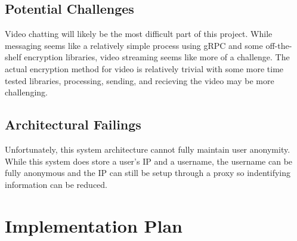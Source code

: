 \documentclass[titlepage]{article}
\begin{document}
    \subsection{Potential Challenges}

    Video chatting will likely be the most difficult part of this project.
    While messaging seems like a relatively simple process using gRPC and some off-the-shelf encryption libraries, video streaming seems like more of a challenge.
    The actual encryption method for video is relatively trivial with some more time tested libraries, processing, sending, and recieving the video may be more challenging.

    \subsection{Architectural Failings}

    Unfortunately, this system architecture cannot fully maintain user anonymity. 
    While this system does store a user's IP and a username, the username can be fully anonymous and the IP can still be setup through a proxy so indentifying information can be reduced.

    \section{Implementation Plan}
\end{document}
